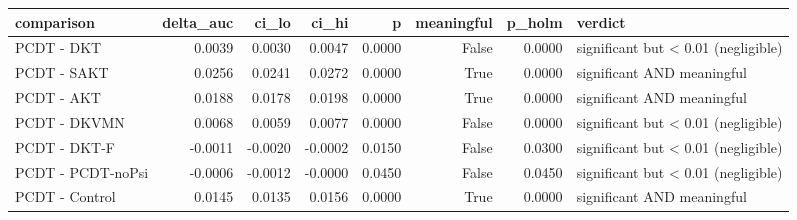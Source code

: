 \begin{tabular}{lrrrrrrl}
\toprule
comparison & delta\_auc & ci\_lo & ci\_hi & p & meaningful & p\_holm & verdict \\
\midrule
PCDT - DKT & 0.0039 & 0.0030 & 0.0047 & 0.0000 & False & 0.0000 & significant but < 0.01 (negligible) \\
PCDT - SAKT & 0.0256 & 0.0241 & 0.0272 & 0.0000 & True & 0.0000 & significant AND meaningful \\
PCDT - AKT & 0.0188 & 0.0178 & 0.0198 & 0.0000 & True & 0.0000 & significant AND meaningful \\
PCDT - DKVMN & 0.0068 & 0.0059 & 0.0077 & 0.0000 & False & 0.0000 & significant but < 0.01 (negligible) \\
PCDT - DKT-F & -0.0011 & -0.0020 & -0.0002 & 0.0150 & False & 0.0300 & significant but < 0.01 (negligible) \\
PCDT - PCDT-noPsi & -0.0006 & -0.0012 & -0.0000 & 0.0450 & False & 0.0450 & significant but < 0.01 (negligible) \\
PCDT - Control & 0.0145 & 0.0135 & 0.0156 & 0.0000 & True & 0.0000 & significant AND meaningful \\
\bottomrule
\end{tabular}
